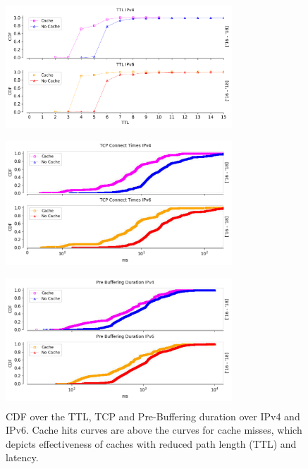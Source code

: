 \begin{figure}[!ht]
	\centering
	\begin{minipage}{0.5\textwidth}
		\centering
		\includegraphics[keepaspectratio, height=5cm, width=8.5cm]{figures/traceroute/netflix-traceroute-cache-vs-origin-cdf.pdf}
	\end{minipage}
	\begin{minipage}{0.5\textwidth}
		\centering
		\includegraphics[keepaspectratio, height=5cm, width=8.5cm]{figures/traceroute/netflix-traceroute-tcp-cache-vs-origin-cdf.pdf}
	\end{minipage}
	\begin{minipage}{0.5\textwidth}
		\centering
		\includegraphics[keepaspectratio, height=5cm, width=8.5cm]{figures/traceroute/netflix-traceroute-pd-cache-vs-origin-cdf.pdf}
	\end{minipage}
	\caption[TTL, TCP and Pre-buffering Duration Cache Vs Origin CDF Absolute]{CDF over the TTL, TCP and Pre-Buffering duration over IPv4 and IPv6. Cache hits curves are above the curves for cache misses, which
	depicts effectiveness of caches with reduced path length (TTL) and latency.}
	\label{fig:TTL, TCP, and PreBuffering Duration Cache Vs Origin CDF Absolute}
\end{figure}

